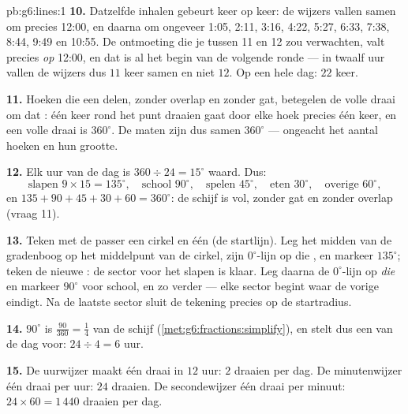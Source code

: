 \begin{solution}{pb:g6:lines:1}
\textbf{10.} Datzelfde inhalen gebeurt keer op keer: de wijzers vallen samen om
precies 12:00, en daarna om ongeveer 1:05, 2:11, 3:16, 4:22, 5:27, 6:33, 7:38,
8:44, 9:49 en 10:55. De ontmoeting die je tussen 11 en 12 zou verwachten, valt
precies \emph{op} 12:00, en dat is al het begin van de volgende ronde --- in
twaalf uur vallen de wijzers dus $11$ keer samen en niet $12$. Op een hele dag:
$22$ keer.

\textbf{11.} Hoeken die een  delen, zonder overlap en zonder gat,
betegelen de volle draai om dat : één keer rond het punt draaien gaat
door elke hoek precies één keer, en een volle draai is $360^\circ$. De maten
zijn dus samen $360^\circ$ --- ongeacht het aantal hoeken en hun grootte.

\textbf{12.} Elk uur van de dag is $360 \div 24 = 15^\circ$ waard. Dus:
\[
\text{slapen } 9 \times 15 = 135^\circ, \quad
\text{school } 90^\circ, \quad
\text{spelen } 45^\circ, \quad
\text{eten } 30^\circ, \quad
\text{overige } 60^\circ,
\]
en $135 + 90 + 45 + 30 + 60 = 360^\circ$: de schijf is vol, zonder gat en
zonder overlap (vraag 11).

\textbf{13.} Teken met de passer een cirkel en één  (de startlijn). Leg
het midden van de gradenboog op het middelpunt van de cirkel, zijn
$0^\circ$-lijn op die , en markeer $135^\circ$; teken de nieuwe :
de sector voor het slapen is klaar. Leg daarna de $0^\circ$-lijn op
\emph{die}  en markeer $90^\circ$ voor school, en zo verder --- elke
sector begint waar de vorige eindigt. Na de laatste sector sluit de tekening
precies op de startradius.

\textbf{14.} $90^\circ$ is $\frac{90}{360} = \frac14$ van de schijf
(\cref{met:g6:fractions:simplify}), en stelt dus een  van de dag voor:
$24 \div 4 = 6$ uur.

\textbf{15.} De uurwijzer maakt één draai in $12$ uur: $2$ draaien per dag. De
minutenwijzer één draai per uur: $24$ draaien. De secondewijzer één draai per
minuut: $24 \times 60 = 1\,440$ draaien per dag.
\end{solution}
